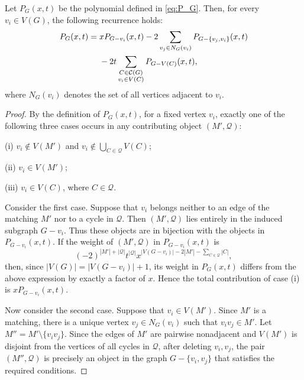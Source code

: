 \documentclass[11pt, a4paper]{article}
\begin{document}
\begin{lemma}\label{lem:vertex-recurrence}
Let $P_G(x,t)$ be the polynomial defined in \eqref{eq:P_G}.
Then, for every $v_i\in V(G)$, the following recurrence holds:
\begin{align}\label{eq:vertex-recurrence}
 P_G(x,t)
 ={}&xP_{G-v_i}(x,t)
      -2\sum_{v_j\in N_G(v_i)}P_{G-\{v_j,v_i\}}(x,t)
    \notag\\
    &-2t\sum_{\substack{C\in\mathcal{C}(G)\\v_i\in V(C)}}
                   P_{G-V(C)}(x,t),
\end{align}
where $N_G(v_i)$ denotes the set of all vertices adjacent to $v_i$.
\end{lemma}
\begin{proof}
By the definition of $P_G(x,t)$, for a fixed vertex $v_i$,
exactly one of the following three cases occurs in any contributing object $(M',\mathcal{Q})$:

(i) $v_i\notin V(M')$ and $v_i\notin\bigcup_{C\in\mathcal{Q}}V(C)$;

(ii) $v_i\in V(M')$;

(iii) $v_i\in V(C)$, where $C\in \mathcal{Q}$.

Consider the first case. Suppose that $v_i$ belongs neither to an edge of the matching $M'$
nor to a cycle in $\mathcal{Q}$.
Then $(M',\mathcal{Q})$ lies entirely in the induced subgraph $G-v_i$.
Thus these objects are in bijection with the objects in $P_{G-v_i}(x,t)$.
If the weight of $(M',\mathcal{Q})$ in $P_{G-v_i}(x,t)$ is
\[
(-2)^{|M'|+|\mathcal{Q}|}t^{|\mathcal{Q}|}
 x^{|V(G-v_i)|-2|M'|-\sum_{C\in \mathcal{Q}}|C|},
\]
then, since $|V(G)|=|V(G-v_i)|+1$,
its weight in $P_G(x,t)$ differs from the above expression by exactly a factor of $x$.
Hence the total contribution of case (i) is $xP_{G-v_i}(x,t)$.

Now consider the second case.
Suppose that $v_i\in V(M')$. Since $M'$ is a matching, there is a unique vertex
$v_j\in N_G(v_i)$ such that $v_iv_j\in M'$. Let
$M''=M'\setminus\{v_iv_j\}$.
Since the edges of $M'$ are pairwise nonadjacent and $V(M')$ is disjoint from the vertices of all cycles in $\mathcal{Q}$,
after deleting $v_i,v_j$, the pair $(M'',\mathcal{Q})$ is precisely an object in the graph
$G-\{v_i,v_j\}$ that satisfies the required conditions.


\end{proof}
\end{document}
